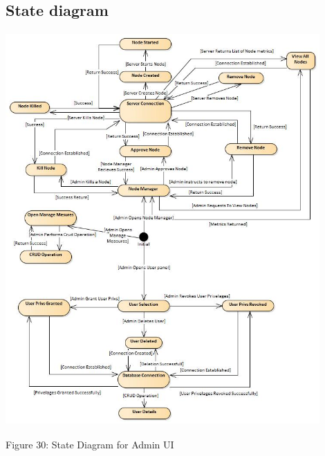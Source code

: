 \subsection{State diagram}
    \includegraphics[width=12cm,height=15cm,keepaspectratio]{admin_ui/images/State_Diagram.jpg}
		\begin{center}
	    \small{Figure 30: State Diagram for Admin UI}
    \end{center}




